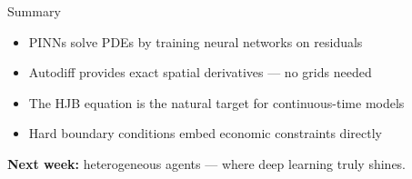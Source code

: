 \documentclass[aspectratio=169, 10pt]{beamer}
\begin{document}
\begin{frame}{Summary}
\begin{itemize}
\item PINNs solve PDEs by training neural networks on residuals
\item Autodiff provides exact spatial derivatives --- no grids needed
\item The HJB equation is the natural target for continuous-time models
\item Hard boundary conditions embed economic constraints directly
\end{itemize}

\bigskip
\textbf{Next week:} heterogeneous agents --- where deep learning truly shines.
\end{frame}
\end{document}

